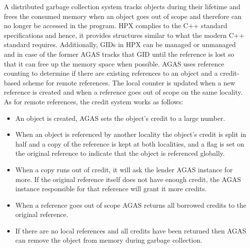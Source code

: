 \begin{enumerate}
{        A distributed garbage collection system tracks objects during their
        lifetime and frees the consumed memory when an object goes out of
        scope and therefore can no longer be accessed in the program. HPX
        complies to the C++ standard specifications and hence, it provides
        structures similar to what the modern C++ standard requires.
        Additionally, GIDs in HPX can be managed or unmanaged and in case of
        the former AGAS tracks that GID until the reference is lost so that it
        can free up the memory space when possible. AGAS uses reference
        counting to determine if there are existing references to an object and
        a credit-based scheme for remote references. The local counter is
        updated when a new reference is created and when a reference goes out
        of scope on the same locality. As for remote references, the credit
        system works as follows:}

    \begin{itemize}
        \item{An object is created, AGAS sets the object's credit to a large
              number.}
        \item{When an object is referenced by another locality the object's
              credit is split in half and a copy of the reference is kept at both
              localities, and a flag is set on the original reference to
              indicate that the object is referenced globally.}
        \item{When a copy runs out of credit, it will ask the lender AGAS
              instance for more. If the original reference itself does not have
              enough credit, the AGAS instance responsible for that reference
              will grant it more credits.}
        \item{When a reference goes out of scope AGAS returns all borrowed
              credits to the original reference.}
        \item{If there are no local references and all credits have been
              returned then AGAS can remove the object from memory during garbage
              collection.}
    \end{itemize}
\end{enumerate}

